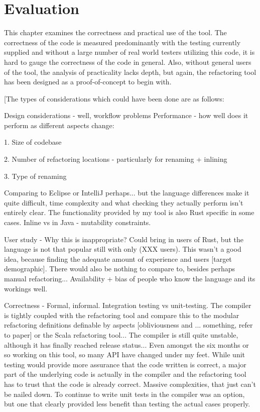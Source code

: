\chapter{Evaluation}\label{C:eval}
This chapter examines the correctness and practical use of the tool. The correctness of the code is measured predominantly with the testing currently supplied and without a large number of real world testers utilizing this code, it is hard to gauge the correctness of the code in general. Also, without general users of the tool, the analysis of practicality lacks depth, but again, the refactoring tool has been designed as a proof-of-concept to begin with.

[The types of considerations which could have been done are as follows:

Design considerations - well, workflow problems
Performance - how well does it perform as different aspects change:

1. Size of codebase

2. Number of refactoring locations - particularly for renaming + inlining

3. Type of renaming

Comparing to Eclipse or IntelliJ perhaps... but the language differences make it quite difficult, time complexity and what checking they actually perform isn't entirely clear. The functionality provided by my tool is also Rust specific in some cases. Inline vs in Java - mutability constraints.

User study - Why this is inappropriate? Could bring in users of Rust, but the language is not that popular still with only (XXX users). This wasn't a good idea, because finding the adequate amount of experience and users [target demographic]. There would also be nothing to compare to, besides perhaps manual refactoring... Availability + bias of people who know the language and its workings well.

Correctness - Formal, informal. Integration testing vs unit-testing. The compiler is tightly coupled with the refactoring tool and compare this to the modular refactoring definitions definable by aspects [obliviousness and ... something, refer to paper] or the Scala refactoring tool... The compiler is still quite unstable, although it has finally reached release status... Even amongst the six months or so working on this tool, so many API have changed under my feet. While unit testing would provide more assurance that the code written is correct, a major part of the underlying code is actually in the compiler and the refactoring tool has to trust that the code is already correct. Massive complexities, that just can't be nailed down. To continue to write unit tests in the compiler was an option, but one that clearly provided less benefit than testing the actual cases properly.

